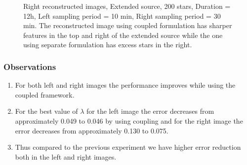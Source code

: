 \begin{enumerate}
\begin{figure}[H]
\hspace{0.4in}
\hspace{0.2in}
\caption [Right reconstructed images , Extended source, 200 stars,  Duration = 12h, Left sampling period = 10 min, Right sampling period = 30 min]{Right  reconstructed images, Extended source, 200 stars,  Duration = 12h, Left sampling period = 10 min, Right sampling period = 30 min. The reconstructed image using coupled formulation has sharper features in the top and right of the extended source while the one using separate formulation has excess stars in the right.}
\label{fig:expt76}
\end{figure}


\end{enumerate}
\subsubsection{Observations}
\begin{enumerate}
\item For both left and right images the performance improves while using the coupled framework.
\item For the best value of $\lambda$ for the left image the error decreases from approximately 0.049 to 0.046 by using coupling and for the right image the error decreases from approximately  0.130 to 0.075.
\item Thus compared to the previous experiment we have higher error reduction both in the left and right images.
\end{enumerate}

